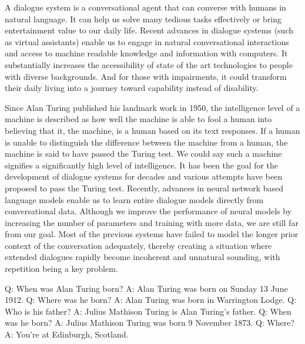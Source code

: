 \documentclass[bsc,frontabs,twoside,singlespacing,parskip,deptreport]{infthesis}     %
\begin{document}
A dialogue system is a conversational agent that can converse with humans in natural language. It can help us solve many tedious tasks effectively or bring entertainment value to our daily life. Recent advances in dialogue systems (such as virtual assistants\cite{alexa,cortana,siri}) enable us to engage in natural conversational interactions and access to machine readable knowledge and information with computers. It substantially increases the accessibility of state of the art technologies to people with diverse backgrounds. And for those with impairments, it could transform their daily living into a journey toward capability instead of disability.

Since Alan Turing published his landmark work in 1950\cite{turing1950computing}, the intelligence level of a machine is described as how well the machine is able to fool a human into believing that it, the machine, is a human based on its text responses. If a human is unable to distinguish the difference between the machine from a human, the machine is said to have passed the Turing test. We could say such a machine signifies a significantly high level of intelligence. It has been the goal for the development of dialogue systems for decades and various attempts have been proposed to pass the Turing test. Recently, advances in neural network based language models enable us to learn entire dialogue models directly from conversational data. Although we improve the performance of neural models by increasing the number of parameters and training with more data, we are still far from our goal. Most of the previous systems have failed to model the longer prior context of the conversation adequately, thereby creating a situation where extended dialogues rapidly become incoherent and unnatural sounding, with repetition being a key problem. 

\begin{exe}
	\ex
		\begin{xlist}
			\ex \label{q1} Q: When was Alan Turing born?
			\ex \label{a1} A: Alan Turing was born on Sunday 13 June 1912.
			\ex \label{q2} Q: Where was he born?
			\ex \label{a2} A: Alan Turing was born in Warrington Lodge.
			\ex \label{q3} Q: Who is his father?
			\ex \label{a3} A: Julius Mathison Turing is Alan Turing’s father.
			\ex \label{q4} Q: When was he born?
			\ex \label{a4} A: Julius Mathison Turing was born 9 November 1873.
			\ex \label{q5} Q: Where?
			\ex \label{a5} A: You’re at Edinburgh, Scotland.
	\end{xlist}
	\end{exe}
\end{document}

